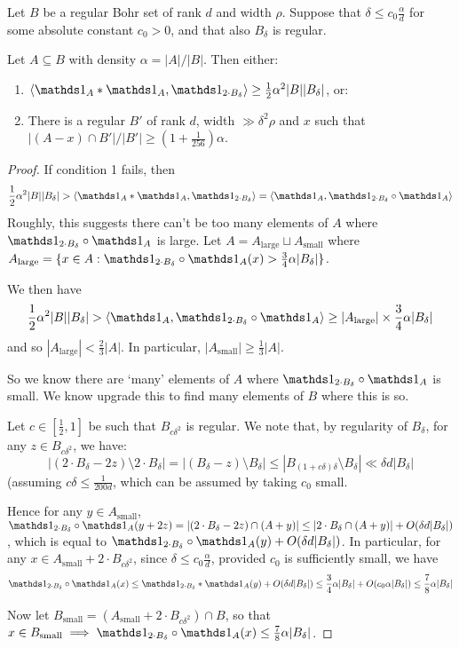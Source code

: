\documentclass[10pt,a4paper]{article}
\begin{document}
\begin{lemma}
  Let $B$ be a regular Bohr set of rank $d$ and width $\rho$. Suppose that $\delta \leq c_0 \frac{\alpha}{d}$ for some absolute constant $c_0 > 0$, and that also $B_\delta$ is regular.

  Let $A \subseteq B$ with density $\alpha = |A|/|B|$. Then either:
  \begin{enumerate}
    \item $\angle{\one_A \ast \one_A, \one_{2\cdot B_\delta}} \geq \frac12 \alpha^2 |B||B_\delta|$, or:
    \item There is a regular $B'$ of rank $d$, width $\gg \delta^2 \rho$ and $x$ such that $|(A-x)\cap B'|/|B'| \geq (1+\frac{1}{256})\alpha$.
  \end{enumerate}
\end{lemma}
\begin{proof}
  If condition 1 fails, then
  \[\frac12\alpha^2 |B||B_{\delta}| > \angle{\one_A \ast \one_A, \one_{2\cdot B_\delta}} = \angle{\one_A, \one_{2\cdot B_\delta}\circ \one_A}\]
  Roughly, this suggests there can't be too many elements of $A$ where $\one_{2\cdot B_\delta} \circ \one_A$ is large. Let $A = A_{\text{large}}\sqcup A_{\text{small}}$ where $A_{\text{large}} = \{x \in A : \one_{2\cdot B_\delta} \circ \one_A (x) > \frac34 \alpha|B_\delta|\}$.

  We then have
  \[\frac12 \alpha^2 |B||B_\delta| > \angle{\one_A, \one_{2\cdot B_\delta} \circ \one_A} \geq |A_{\text{large}}|\times \frac{3}{4}\alpha |B_\delta|\]
  and so $|A_{\text{large}}| < \frac{2}{3}|A|$. In particular, $|A_{\text{small}}| \geq \frac13 |A|$.

  So we know there are `many' elements of $A$ where $\one_{2\cdot B_\delta}\circ \one_A$ is small. We know upgrade this to find many elements of $B$ where this is so.

  Let $c \in [\frac12, 1]$ be such that $B_{c\delta^2}$ is regular. We note that, by regularity of $B_\delta$, for any $z \in B_{c\delta^2}$, we have:
  \[|(2\cdot B_\delta - 2z)\setminus 2 \cdot B_\delta| = |(B_\delta -z)\setminus B_\delta| \leq |B_{(1+c\delta)\delta} \setminus B_\delta| \ll \delta d |B_\delta|\]
  (assuming $c\delta \leq \frac{1}{200d}$, which can be assumed by taking $c_0$ small.

  Hence for any $y \in A_{\text{small}}$, $\one_{2\cdot B_\delta}\circ \one_A(y+2z) = |(2\cdot B_\delta-2z) \cap (A+y)| \leq |2\cdot B_\delta\cap(A+y)| + O(\delta d |B_\delta|)$, which is equal to $\one_{2\cdot B_\delta} \circ \one_A(y) + O(\delta d|B_\delta|)$. In particular, for any $x \in A_{\text{small}}+2\cdot B_{c\delta^2}$, since $\delta \leq c_0 \frac{\alpha}{d}$, provided $c_0$ is sufficiently small, we have
  \[\one_{2\cdot B_\delta}\circ \one_A(x) \leq \one_{2\cdot B_\delta}\ast \one_A(y) + O(\delta d |B_\delta|) \leq \frac{3}{4}\alpha|B_\delta| + O(c_0\alpha|B_\delta|) \leq \frac78 \alpha|B_\delta|\]

  Now let $B_{\text{small}} = (A_{\text{small}} + 2 \cdot B_{c\delta^2})\cap B$, so that $x \in B_{\text{small}} \implies \one_{2\cdot B_\delta}\circ \one_A (x) \leq \frac78 \alpha |B_\delta|$.
\end{proof}
\end{document}

